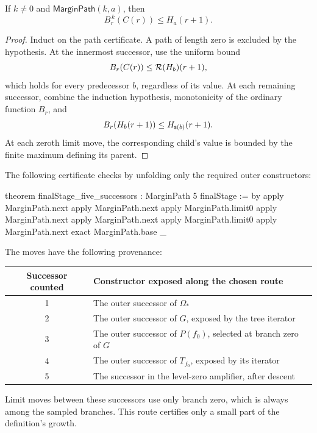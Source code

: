 \begin{lemma}\label{lem:path}
If \(k\ne0\) and \(\mathsf{MarginPath}(k,a)\), then
\[
                         B_r^{\,k}(C(r))\le H_a(r+1).
\]
\end{lemma}
\begin{proof}
Induct on the path certificate. A path of length zero is excluded by
the hypothesis. At the innermost successor, use the uniform bound
\[
                    B_r(C(r))\le\mathcal R(H_b)(r+1),
\]
which holds for every predecessor \(b\), regardless of its value.
At each remaining successor, combine the induction hypothesis,
monotonicity of the ordinary function \(B_r\), and
\[
                    B_r(H_b(r+1))\le H_{\mathsf s(b)}(r+1).
\]
At each zeroth limit move, the corresponding child's value is bounded
by the finite maximum defining its parent.
\end{proof}

The following certificate checks by unfolding only the required outer
constructors:
\begin{LeanCode}
theorem finalStage_five_successors :
    MarginPath 5 finalStage := by
  apply MarginPath.next
  apply MarginPath.next
  apply MarginPath.limit0
  apply MarginPath.next
  apply MarginPath.next
  apply MarginPath.limit0
  apply MarginPath.next
  exact MarginPath.base _
\end{LeanCode}
The moves have the following provenance:
\begin{center}
\begin{tabular}{cl}
\toprule
Successor counted & Constructor exposed along the chosen route\\
\midrule
1 & The outer successor of \(\Omega_*\)\\
2 & The outer successor of \(G\), exposed by the tree iterator\\
3 & The outer successor of \(P(f_0)\), selected at branch zero of \(G\)\\
4 & The outer successor of \(T_{f_0}\), exposed by its iterator\\
5 & The successor in the level-zero amplifier, after descent\\
\bottomrule
\end{tabular}
\end{center}
Limit moves between these successors use only branch zero, which is
always among the sampled branches. This route certifies only a small
part of the definition's growth.

